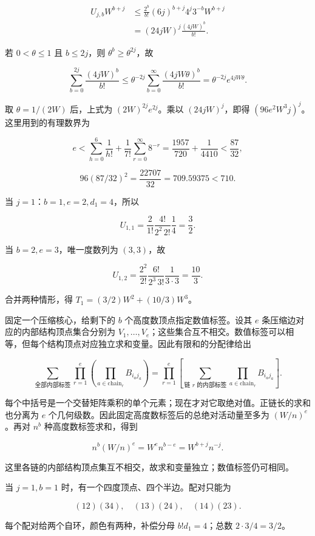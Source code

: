 \documentclass[11pt,a4paper]{article}
\begin{document}
\[
\begin{aligned}
U_{j,b}W^{b+j}
&\le\frac{2^b}{b!}(6j)^{b+j}4^j3^{-b}W^{b+j}\\
&=(24jW)^j\frac{(4jW)^b}{b!}.
\end{aligned}
\]

若 \(0<\theta\le1\) 且 \(b\le2j\)，则 \(\theta^b\ge\theta^{2j}\)，故

\[
\sum_{b=0}^{2j}\frac{(4jW)^b}{b!}
\le\theta^{-2j}\sum_{b=0}^{\infty}\frac{(4jW\theta)^b}{b!}
=\theta^{-2j}e^{4jW\theta}.
\]

取 \(\theta=1/(2W)\) 后，上式为 \((2W)^{2j}e^{2j}\)。乘以 \((24jW)^j\)，即得 \((96e^2W^3j)^j\)。这里用到的有理数界为

\[
e<\sum_{h=0}^6\frac1{h!}+\frac1{7!}\sum_{r=0}^{\infty}8^{-r}
=\frac{1957}{720}+\frac1{4410}<\frac{87}{32},
\]

\[
96(87/32)^2=\frac{22707}{32}=709.59375<710.
\]

当 \(j=1\)：\(b=1,e=2,d_1=4\)，所以

\[
U_{1,1}=\frac2{1!}\frac{4!}{2^2\,2!}\frac14=\frac32.
\]

当 \(b=2,e=3\)，唯一度数列为 \((3,3)\)，故

\[
U_{1,2}=\frac{2^2}{2!}\frac{6!}{2^3\,3!}\frac1{3\cdot3}=\frac{10}{3}.
\]

合并两种情形，得 \(T_1=(3/2)W^2+(10/3)W^3\)。

固定一个压缩核心，给剩下的 \(b\) 个高度数顶点指定数值标签。设其 \(e\) 条压缩边对应的内部结构顶点集合分别为 \(V_1,\ldots,V_e\)；这些集合互不相交。数值标签可以相等，但每个结构顶点对应独立求和变量。因此有限和的分配律给出

\[
\sum_{\text{全部内部标签}}\prod_{r=1}^e
\left(\prod_{a\in\mathrm{chain}_r}B_{i_aj_a}\right)
=\prod_{r=1}^e\left[
\sum_{\text{链 }r\text{ 的内部标签}}
\prod_{a\in\mathrm{chain}_r}B_{i_aj_a}\right].
\]

每个中括号是一个交替矩阵乘积的单个元素；现在才对它取绝对值。正链长的求和也分离为 \(e\) 个几何级数。因此固定高度数标签后的总绝对活动量至多为 \((W/n)^e\)。再对 \(n^b\) 种高度数标签求和，得到

\[
n^b(W/n)^e=W^en^{b-e}=W^{b+j}n^{-j}.
\]

这里各链的内部结构顶点集互不相交，故求和变量独立；数值标签仍可相同。

当 \(j=1,b=1\) 时，有一个四度顶点、四个半边。配对只能为

\[
(12)(34),\quad(13)(24),\quad(14)(23).
\]

每个配对给两个自环，颜色有两种，补偿分母 \(b!d_1=4\)；总数 \(2\cdot3/4=3/2\)。
\end{document}

